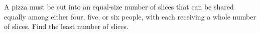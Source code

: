 A pizza must be cut into an equal-size number of slices that can be shared equally among either four, five, or six people, with each receiving a whole number of slices. Find the least number of slices.
